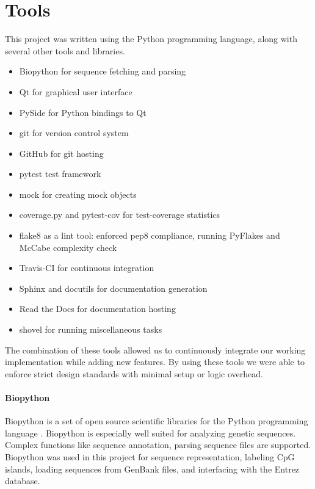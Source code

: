 \documentclass{bioinfo}
\begin{document}
\section{Tools}

This project was written using the Python programming language, along with several other tools and libraries.

\begin{itemize}
\item Biopython for sequence fetching and parsing
\item Qt for graphical user interface
\item PySide for Python bindings to Qt
\item git for version control system
\item GitHub for git hosting
\item pytest test framework
\item mock for creating mock objects
\item coverage.py and pytest-cov for test-coverage statistics
\item flake8 as a lint tool: enforced pep8 compliance, running PyFlakes and McCabe complexity check
\item Travis-CI for continuous integration
\item Sphinx and docutils for documentation generation
\item Read the Docs for documentation hosting
\item shovel for running miscellaneous tasks
\end{itemize}

The combination of these tools allowed us to continuously integrate our working implementation while adding new features. By using these tools we were able to enforce strict design standards with minimal setup or logic overhead.

\paragraph{Biopython\textcolon}
      Biopython is a set of open source scientific libraries for the Python programming language \citep{pmid19304878}. Biopython is especially well suited for analyzing genetic sequences. Complex functions like sequence annotation, parsing sequence files are supported. Biopython was used in this project for sequence representation, labeling CpG islands, loading sequences from GenBank files, and interfacing with the Entrez database.\\
    
\end{document}
